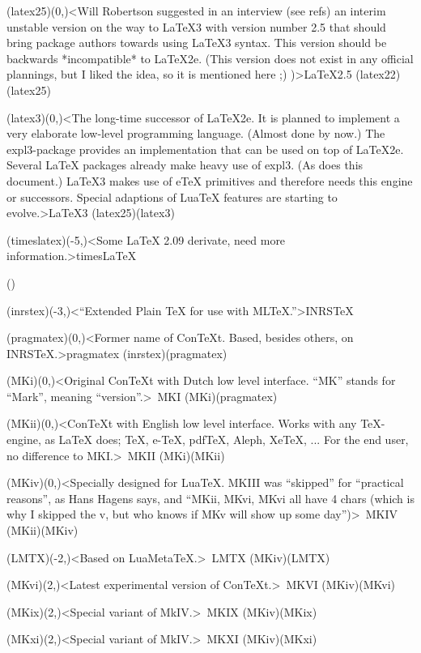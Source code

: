 {	\tonode[\planned](latex25)(0,\layer)<Will Robertson suggested in an interview (see refs) an interim unstable version on the way to LaTeX3 with version number 2.5 that should bring package authors towards using LaTeX3 syntax. This version should be backwards *incompatible* to LaTeX2e. (This version does not exist in any official plannings, but I liked the idea, so it is mentioned here ;) )>{\LaTeX2.5}
	\todraw(latex22)(latex25)
	
	\steplayer[-3]
	\tonode[\planned](latex3)(0,\layer)<The long-time successor of LaTeX2e. It is planned to implement a very elaborate low-level programming language. (Almost done by now.) The expl3-package provides an implementation that can be used on top of LaTeX2e. Several LaTeX packages already make heavy use of expl3. (As does this document.) LaTeX3 makes use of eTeX primitives and therefore needs this engine or successors. Special adaptions of LuaTeX features are starting to evolve.>{\LaTeX{}3}
	\todraw(latex25)(latex3)

	\steplayer[-3]
	\tonode[\experimental](timeslatex)(-5,\layer)<Some LaTeX 2.09 derivate, need more information.>{times\LaTeX}
}

\clearpage
\tograph*(){
	\tonode(inrstex)(-3,\layer)<“Extended Plain TeX for use with MLTeX.”>{INRS\TeX}
	\steplayer[-2]

	\tonode(pragmatex)(0,\layer)<Former name of ConTeXt. Based, besides others, on INRSTeX.>{pragmatex}
	\todraw(inrstex)(pragmatex)
	\steplayer[-2]

	\tonode(MKi)(0,\layer)<Original ConTeXt with Dutch low level interface. “MK” stands for “Mark”, meaning “version”.>{\ConTeXt\ MKI}
	\todraw(MKi)(pragmatex)
	\steplayer[-2]

	\tonode[\vip](MKii)(0,\layer)<ConTeXt with English low level interface. Works with any TeX-engine, as LaTeX does; TeX, e-TeX, pdfTeX, Aleph, XeTeX, ... For the end user, no difference to MKI.>{\ConTeXt\ MKII}
	\todraw(MKi)(MKii)
	\steplayer[-2]
	
	\tonode[\vip](MKiv)(0,\layer)<Specially designed for LuaTeX. MKIII was “skipped” for “practical reasons”, as Hans Hagens says, and “MKii, MKvi, MKvi all have 4 chars (which is why I skipped the v, but who knows if MKv will show up some day”)>{\ConTeXt\ MKIV}
	\todraw*(MKii)(MKiv)
	\steplayer[-2]
	
	\tonode[\experimental](LMTX)(-2,\layer)<Based on LuaMetaTeX.>{\ConTeXt\ LMTX}
	\todraw(MKiv)(LMTX)
	\steplayer[-2]

	\tonode[\experimental](MKvi)(2,\layer)<Latest experimental version of ConTeXt.>{\ConTeXt\ MKVI}
	\todraw(MKiv)(MKvi)
	
	\tonode[\experimental](MKix)(2,\layer)<Special variant of MkIV.>{\ConTeXt\ MKIX}
	\todraw(MKiv)(MKix)
	
	\tonode[\experimental](MKxi)(2,\layer)<Special variant of MkIV.>{\ConTeXt\ MKXI}
	\todraw(MKiv)(MKxi)
}

